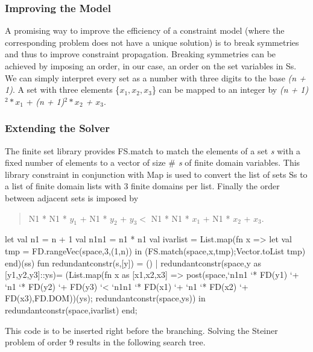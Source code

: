 \documentclass[a4paper]{scrartcl}
\begin{document}
\subsubsection{Improving the Model}
A promising way to improve the efficiency of a constraint
 model (where the corresponding problem does not have a 
unique solution) is to break symmetries and thus to improve 
constraint propagation. Breaking symmetries can be achieved 
by imposing an order, in our case, an order on the set variables 
in Ss. We can simply interpret every set as a number with 
three digits to the base {\it (n + 1)}. A set with three elements 
\{{\it $x_1, x_2, x_3$}\} can be mapped to an integer by 
{\it (n + 1)}{\it $^2 * x_1$} + {\it (n + 1)}{\it $^2 * x_2$ + $x_3$}. 

\subsubsection{Extending the Solver}
The finite set library provides 
FS.match to match 
the elements of a set {\it s} with a fixed number of elements 
to a vector of size {\it $\#$ s} of finite domain variables. This 
library constraint in conjunction with Map is used to 
convert the list of sets Ss to a list of finite domain 
lists with 3 finite domains per list. Finally the order 
between adjacent sets is imposed by 
\begin{quote}
N1 * N1 * $y_1$ + N1 * $y_2$ + $y_3 < $ N1 * N1 * $x_1$ + N1 * $x_2$ + $x_3$.
\end{quote}
\begin{myverbatim}
let 
    val n1 = n + 1
    val n1n1 = n1 * n1
    val ivarlist = List.map(fn x => 
    let 
       val tmp = FD.rangeVec(space,3,(1,n))
     in
       (FS.match(space,x,tmp);Vector.toList tmp)
    end)(ss)
    fun redundantconstr(s,[y]) = ()
      | redundantconstr(space,y as [y1,y2,y3]::ys)= 
             (List.map(fn x as [x1,x2,x3] =>
                 post(space,`n1n1 `* FD(y1) `+ `n1 `* FD(y2) `+
                            FD(y3) `< `n1n1 `* FD(x1) `+ `n1 `* 
                            FD(x2) `+ FD(x3),FD.DOM))(ys);
              redundantconstr(space,ys))       
 in
    redundantconstr(space,ivarlist)
end;
\end{myverbatim}

This code is to be inserted right before the branching. 
Solving the Steiner problem of order 9 results in the following 
search tree. 
\end{document}
